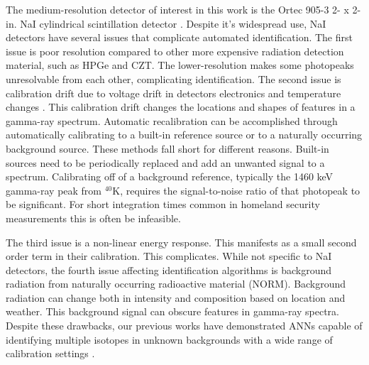 The medium-resolution detector of interest in this work is the Ortec 905-3 2- x 2-in. NaI cylindrical scintillation detector \cite{Hofstadter1948}. Despite it's widespread use, NaI detectors have several issues that complicate automated identification. The first issue is poor resolution compared to other more expensive radiation detection material, such as HPGe and CZT. The lower-resolution makes some photopeaks unresolvable from each other, complicating identification. The second issue is calibration drift due to voltage drift in detectors electronics and temperature changes \cite{knoll,gilmore}. This calibration drift changes the locations and shapes of features in a gamma-ray spectrum. Automatic recalibration can be accomplished through automatically calibrating to a built-in reference source or to a naturally occurring background source. These methods fall short for different reasons. Built-in sources need to be periodically replaced and add an unwanted signal to a spectrum. Calibrating off of a background reference, typically the 1460 keV gamma-ray peak from $^{40}$K, requires the signal-to-noise ratio of that photopeak to be significant. For short integration times common in homeland security measurements this is often be infeasible. 

The third issue is a non-linear energy response. This manifests as a small second order term in their calibration. This complicates. While not specific to NaI detectors, the fourth issue affecting identification algorithms is background radiation from naturally occurring radioactive material (NORM). Background radiation can change both in intensity and composition based on location and weather. This background signal can obscure features in gamma-ray spectra. Despite these drawbacks, our previous works have demonstrated ANNs capable of identifying multiple isotopes in unknown backgrounds with a wide range of calibration settings \cite{kamudaThesis2017,kamuda2017}.





